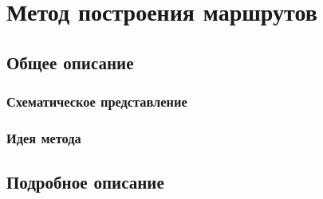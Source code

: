 \chapter{Метод построения маршрутов}
\section{Общее описание}
\subsection{Схематическое представление}
\subsection{Идея метода}
\section{Подробное описание}